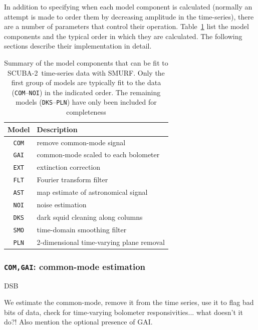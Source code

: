 \documentclass[useAMS,usenatbib,nofootinbib]{mn2e}
\newcommand{\scuba}{SCUBA-2}
\begin{document}
In addition to specifying when each model component is calculated
(normally an attempt is made to order them by decreasing amplitude in
the time-series), there are a number of parameters that control their
operation. Table~\ref{tab:components} list the model components and
the typical order in which they are calculated. The following sections
describe their implementation in detail.

\begin{table}
  \caption{Summary of the model components that can be fit to
    \scuba\ time-series data with SMURF. Only the first group of
    models are typically fit to the data (\texttt{COM}--\texttt{NOI})
    in the indicated order. The remaining models
    (\texttt{DKS}--\texttt{PLN}) have only been included for
    completeness}
  \vspace{0.2cm}
  \centering
  \begin{tabular}{c|l}
    \hline
    Model & Description \\
    \hline
    \texttt{COM} & remove common-mode signal \\
    \texttt{GAI} & common-mode scaled to each bolometer \\
    \texttt{EXT} & extinction correction \\
    \texttt{FLT} & Fourier transform filter \\
    \texttt{AST} & map estimate of astronomical signal \\
    \texttt{NOI} & noise estimation \\
    \hline
    \texttt{DKS} & dark squid cleaning along columns \\
    \texttt{SMO} & time-domain smoothing filter \\
    \texttt{PLN} & 2-dimensional time-varying plane removal \\
    \hline
    \end{tabular}
  \label{tab:components}
\end{table}

\subsubsection{\texttt{COM,GAI}: common-mode estimation}
\label{sec:comgai}

DSB

We estimate the common-mode, remove it from the time series, use it to
flag bad bits of data, check for time-varying bolometer
responsivities... what doesn't it do?! Also mention the optional
presence of GAI.
\end{document}
